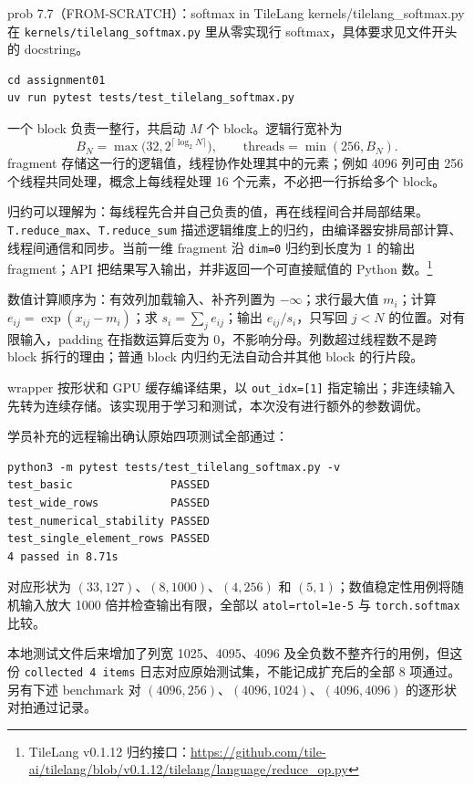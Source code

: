 \documentclass[11pt,a4paper,fontset=none]{ctexart}
\begin{document}
\begin{capstone}{prob 7.7（FROM-SCRATCH）：softmax in TileLang \hfill {\footnotesize\ttfamily kernels/tilelang\_softmax.py}}
在 \texttt{kernels/tilelang\_softmax.py} 里从零实现行 softmax，具体要求见文件开头的 docstring。
\end{capstone}

\begin{lstlisting}
cd assignment01
uv run pytest tests/test_tilelang_softmax.py
\end{lstlisting}

\begin{tcolorbox}[title={7.7 参考实现与归约理解},breakable]
一个 block 负责一整行，共启动 $M$ 个 block。逻辑行宽补为
\[
B_N=\max\bigl(32,2^{\lceil\log_2 N\rceil}\bigr),\qquad
\text{threads}=\min(256,B_N).
\]
fragment 存储这一行的逻辑值，线程协作处理其中的元素；例如 4096 列可由 256 个线程共同处理，概念上每线程处理 16 个元素，不必把一行拆给多个 block。

归约可以理解为：每线程先合并自己负责的值，再在线程间合并局部结果。\texttt{T.reduce\_max}、\texttt{T.reduce\_sum} 描述逻辑维度上的归约，由编译器安排局部计算、线程间通信和同步。当前一维 fragment 沿 \texttt{dim=0} 归约到长度为 1 的输出 fragment；API 把结果写入输出，并非返回一个可直接赋值的 Python 数。\footnote{TileLang v0.1.12 归约接口：\url{https://github.com/tile-ai/tilelang/blob/v0.1.12/tilelang/language/reduce_op.py}}

数值计算顺序为：有效列加载输入、补齐列置为 $-\infty$；求行最大值 $m_i$；计算 $e_{ij}=\exp(x_{ij}-m_i)$；求 $s_i=\sum_j e_{ij}$；输出 $e_{ij}/s_i$，只写回 $j<N$ 的位置。对有限输入，padding 在指数运算后变为 0，不影响分母。列数超过线程数不是跨 block 拆行的理由；普通 block 内归约无法自动合并其他 block 的行片段。

wrapper 按形状和 GPU 缓存编译结果，以 \texttt{out\_idx=[1]} 指定输出；非连续输入先转为连续存储。该实现用于学习和测试，本次没有进行额外的参数调优。
\end{tcolorbox}

\begin{tcolorbox}[title={7.7 正确性实验记录},breakable]
学员补充的远程输出确认原始四项测试全部通过：
\begin{lstlisting}
python3 -m pytest tests/test_tilelang_softmax.py -v
test_basic               PASSED
test_wide_rows           PASSED
test_numerical_stability PASSED
test_single_element_rows PASSED
4 passed in 8.71s
\end{lstlisting}
对应形状为 $(33,127)$、$(8,1000)$、$(4,256)$ 和 $(5,1)$；数值稳定性用例将随机输入放大 1000 倍并检查输出有限，全部以 \texttt{atol=rtol=1e-5} 与 \texttt{torch.softmax} 比较。

本地测试文件后来增加了列宽 1025、4095、4096 及全负数不整齐行的用例，但这份 \texttt{collected 4 items} 日志对应原始测试集，不能记成扩充后的全部 8 项通过。另有下述 benchmark 对 $(4096,256)$、$(4096,1024)$、$(4096,4096)$ 的逐形状对拍通过记录。
\end{tcolorbox}
\end{document}

